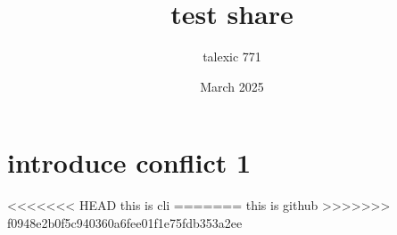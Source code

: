 \documentclass{article}
\title{test share}
\author{talexic 771 }
\date{March 2025}
\begin{document}
\maketitle

\section{introduce conflict 1}
<<<<<<< HEAD
this is cli
=======
this is github
>>>>>>> f0948e2b0f5c940360a6fee01f1e75fdb353a2ee
\end{document}
